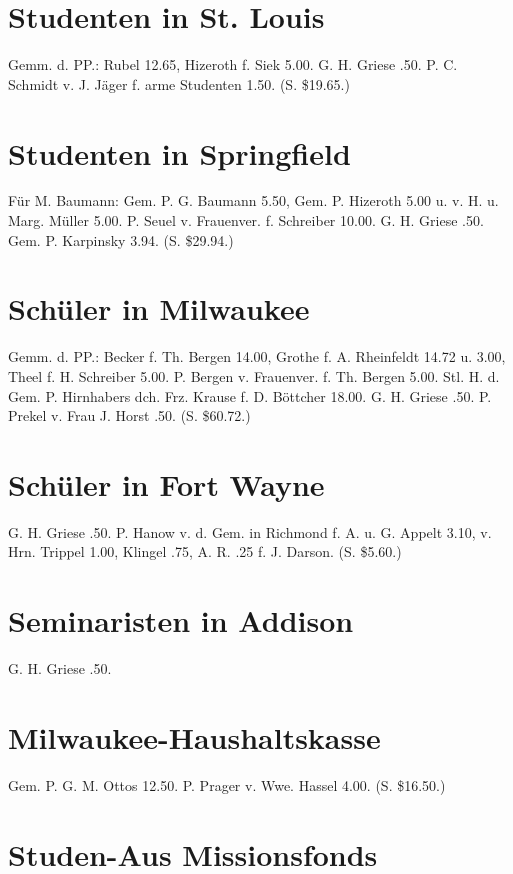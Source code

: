 \section{Studenten in St. Louis}

Gemm. d. PP.: Rubel 12.65, Hizeroth f. Siek 5.00. G. H. Griese .50. P. C. Schmidt v. J. Jäger f. arme Studenten 1.50. (S. \$19.65.)

\section{Studenten in Springfield}

Für M. Baumann: Gem. P. G. Baumann 5.50, Gem. P. Hizeroth 5.00 u. v. H. u. Marg. Müller 5.00. P. Seuel v. Frauenver. f. Schreiber 10.00. G. H. Griese .50. Gem. P. Karpinsky 3.94. (S. \$29.94.)

\section{Schüler in Milwaukee}

Gemm. d. PP.: Becker f. Th. Bergen 14.00, Grothe f. A. Rheinfeldt 14.72 u. 3.00, Theel f. H. Schreiber 5.00. P. Bergen v. Frauenver. f. Th. Bergen 5.00. Stl. H. d. Gem. P. Hirnhabers dch. Frz. Krause f. D. Böttcher 18.00. G. H. Griese .50. P. Prekel v. Frau J. Horst .50. (S. \$60.72.)

\section{Schüler in Fort Wayne}

G. H. Griese .50. P. Hanow v. d. Gem. in Richmond f. A. u. G. Appelt 3.10, v. Hrn. Trippel 1.00, Klingel .75, A. R. .25 f. J. Darson. (S. \$5.60.)

\section{Seminaristen in Addison}

G. H. Griese .50.

\section{Milwaukee-Haushaltskasse}

Gem. P. G. M. Ottos 12.50. P. Prager v. Wwe. Hassel 4.00. (S. \$16.50.)

\section{Studen-Aus Missionsfonds}

